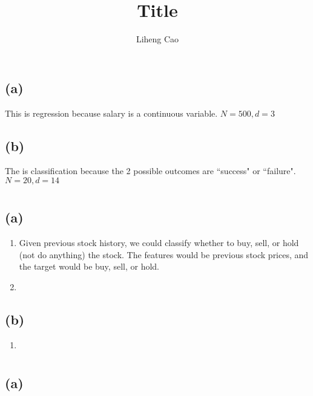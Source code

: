 \documentclass[12pt]{article}
\title{Title}
\author{Liheng Cao}
\begin{document}
\maketitle

\section{}
\subsection*{(a)}
This is regression because salary is a continuous variable. $N = 500, d = 3$

\subsection*{(b)}
The is classification because the 2 possible outcomes are ``success" or ``failure". $N = 20, d = 14$
\newpage

\section{}
\subsection*{(a)}
\begin{enumerate}
	\item Given previous stock history, we could classify whether to buy, sell, or hold (not do anything) the stock. The features would be previous stock prices, and the target would be buy, sell, or hold.
	
	\item 
\end{enumerate}
\subsection*{(b)}
\begin{enumerate}
	\item 
\end{enumerate}
\newpage

\section{}
\subsection*{(a)}
\end{document}

